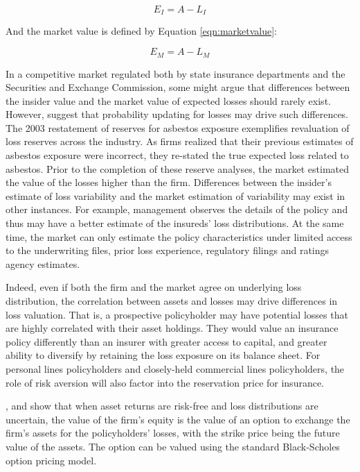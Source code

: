 \begin{equation}\label{eqn:intrinsicvalue}
E_I=A-L_I
\end{equation}

And the market value is defined by Equation \ref{eqn:marketvalue}:

\begin{equation}\label{eqn:marketvalue}
E_M=A-L_M
\end{equation}

In a competitive market regulated both by state insurance departments and the Securities and Exchange Commission, some might argue that differences between the insider value and the market value of expected losses should rarely exist.  However, \citet{weiss2004a} suggest that probability updating for losses may drive such differences. The 2003 restatement of reserves for asbestos exposure exemplifies revaluation of loss reserves across the industry. As firms realized that their previous estimates of asbestos exposure were incorrect, they re-stated the true expected loss related to asbestos. Prior to the completion of these reserve analyses, the market estimated the value of the losses higher than the firm.  Differences between the insider's estimate of loss variability and the market estimation of variability may exist in other instances. For example, management observes the details of the policy and thus may have a better estimate of the insureds' loss distributions. At the same time, the market can only estimate the policy characteristics under limited access to the underwriting files, prior loss experience, regulatory filings and ratings agency estimates.

Indeed, even if both the firm and the market agree on underlying loss distribution, the correlation between assets and losses may drive differences in loss valuation. That is, a prospective policyholder may have potential losses that are highly correlated with their asset holdings.  They would value an insurance policy differently than an insurer with greater access to capital, and greater ability to diversify by retaining the loss exposure on its balance sheet.  For personal lines policyholders and closely-held commercial lines policyholders, the role of risk aversion will also factor into the reservation price for insurance.

\citet{doherty1986a}, \citet{babbel2005a} and \citet{obrien2004a} show that when asset returns are risk-free and loss distributions are uncertain, the value of the firm's equity is the value of an option to exchange the firm's assets for the policyholders' losses, with the strike price being the future value of the assets. The option can be valued using the standard Black-Scholes option pricing model.  

